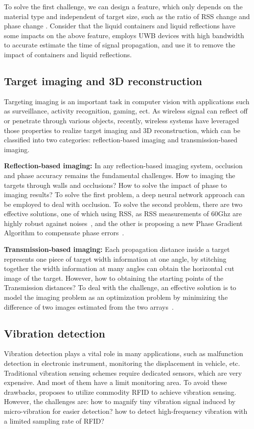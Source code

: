 To solve the first challenge, we can design a feature, which only depends on the material type and independent of target size, such as the ratio of RSS change and phase change \cite{Tagscan}. Consider that the liquid containers and liquid reflections have some impacts on the above feature, \cite{LiquID} employs UWB devices with high bandwidth to accurate estimate the time of signal propagation, and use it to remove the impact of containers and liquid reflections.


\subsection{Target imaging and 3D reconstruction} Targeting imaging is an important task in computer vision with applications such as surveillance, activity recognition, gaming, ect. As wireless signal can reflect off or penetrate through various objects, recently, wireless systems have leveraged those properties to realize target imaging and 3D reconstruction, which can be classified into two categories: reflection-based imaging and transmission-based imaging.


\textbf{Reflection-based imaging:} In any reflection-based imaging system, occlusion and phase accuracy remains the fundamental challenges. How to imaging the targets through walls and occlusions? How to solve the impact of phase to imaging results?
To solve the first problem, a deep neural network approach can be employed to deal with occlusion. To solve the second problem, there are two effective solutions, one of which using RSS, as RSS measurements of 60Ghz are highly robust against noises~\cite{Zhu2015Reusing}, and the other is proposing a new Phase Gradient Algorithm to compensate phase errors~\cite{mao2018aim}.

\textbf{Transmission-based imaging:} Each propagation distance inside a target represents one piece of target width information at one angle, by stitching together the width information at many angles can obtain the horizontal cut image of the target. However, how to obtaining the starting points of the Transmission distances?
To deal with the challenge, an effective solution is to model the imaging problem as an optimization problem by minimizing the difference of two images estimated from the two arrays~\cite{Tagscan}.


\subsection{Vibration detection} Vibration detection plays a vital role in many applications, such as malfunction detection in electronic instrument, monitoring the displacement in vehicle, etc. Traditional vibration sensing schemes require dedicated sensors, which are very expensive. And most of them have a limit monitoring area. To avoid these drawbacks, \cite{Tagbeat} proposes to utilize commodity RFID to achieve
vibration sensing. However, the challenges are: how to magnify tiny vibration signal induced by micro-vibration for easier detection? how to detect high-frequency vibration with a limited sampling rate of RFID?

